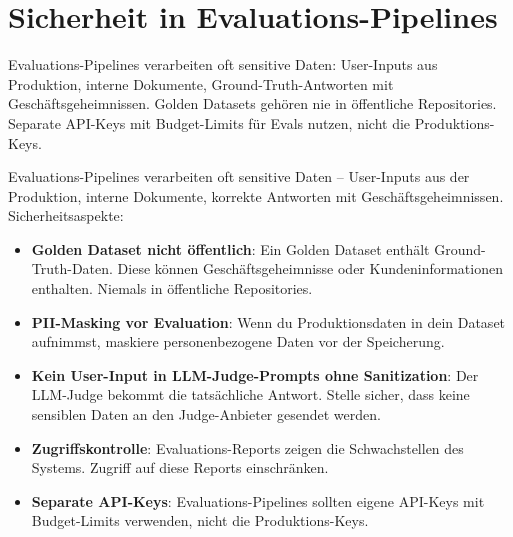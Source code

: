 
\section{Sicherheit in Evaluations-Pipelines}

\begin{praxishinweis}
Evaluations-Pipelines verarbeiten oft sensitive Daten: User-Inputs aus Produktion, interne Dokumente, Ground-Truth-Antworten mit Geschäftsgeheimnissen. Golden Datasets gehören nie in öffentliche Repositories. Separate API-Keys mit Budget-Limits für Evals nutzen, nicht die Produktions-Keys.
\end{praxishinweis}

Evaluations-Pipelines verarbeiten oft sensitive Daten -- User-Inputs aus der Produktion, interne Dokumente, korrekte Antworten mit Geschäftsgeheimnissen. Sicherheitsaspekte:

\begin{itemize}[leftmargin=*]
    \item \textbf{Golden Dataset nicht öffentlich}: Ein Golden Dataset enthält Ground-Truth-Daten. Diese können Geschäftsgeheimnisse oder Kundeninformationen enthalten. Niemals in öffentliche Repositories.
    \item \textbf{PII-Masking vor Evaluation}: Wenn du Produktionsdaten in dein Dataset aufnimmst, maskiere personenbezogene Daten vor der Speicherung.
    \item \textbf{Kein User-Input in LLM-Judge-Prompts ohne Sanitization}: Der LLM-Judge bekommt die tatsächliche Antwort. Stelle sicher, dass keine sensiblen Daten an den Judge-Anbieter gesendet werden.
    \item \textbf{Zugriffskontrolle}: Evaluations-Reports zeigen die Schwachstellen des Systems. Zugriff auf diese Reports einschränken.
    \item \textbf{Separate API-Keys}: Evaluations-Pipelines sollten eigene API-Keys mit Budget-Limits verwenden, nicht die Produktions-Keys.
\end{itemize}

